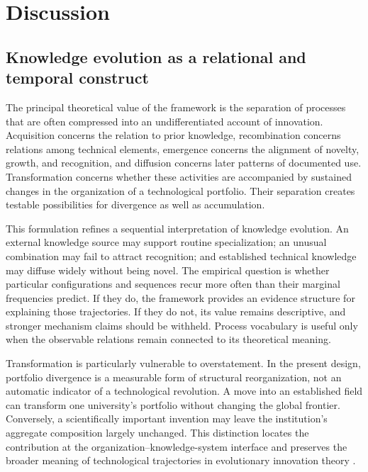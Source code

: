 \FloatBarrier
\section{Discussion}\label{sec:discussion}
\subsection{Knowledge evolution as a relational and temporal construct}
The principal theoretical value of the framework is the separation of processes
that are often compressed into an undifferentiated account of innovation.
Acquisition concerns the relation to prior knowledge, recombination concerns
relations among technical elements, emergence concerns the alignment of novelty,
growth, and recognition, and diffusion concerns later patterns of documented use.
Transformation concerns whether these activities are accompanied by sustained
changes in the organization of a technological portfolio. Their separation creates
testable possibilities for divergence as well as accumulation.

This formulation refines a sequential interpretation of knowledge evolution.
An external knowledge source may support routine specialization; an unusual
combination may fail to attract recognition; and established technical knowledge
may diffuse widely without being novel. The empirical question is whether
particular configurations and sequences recur more often than their marginal
frequencies predict. If they do, the framework provides an evidence structure
for explaining those trajectories. If they do not, its value remains descriptive,
and stronger mechanism claims should be withheld. Process vocabulary is useful
only when the observable relations remain connected to its theoretical meaning.

Transformation is particularly vulnerable to overstatement. In the present
design, portfolio divergence is a measurable form of structural reorganization,
not an automatic indicator of a technological revolution. A move into an
established field can transform one university's portfolio without changing the
global frontier. Conversely, a scientifically important invention may leave the
institution's aggregate composition largely unchanged. This distinction locates
the contribution at the organization--knowledge-system interface and preserves
the broader meaning of technological trajectories in evolutionary innovation
theory \citep{dosi1982}.

